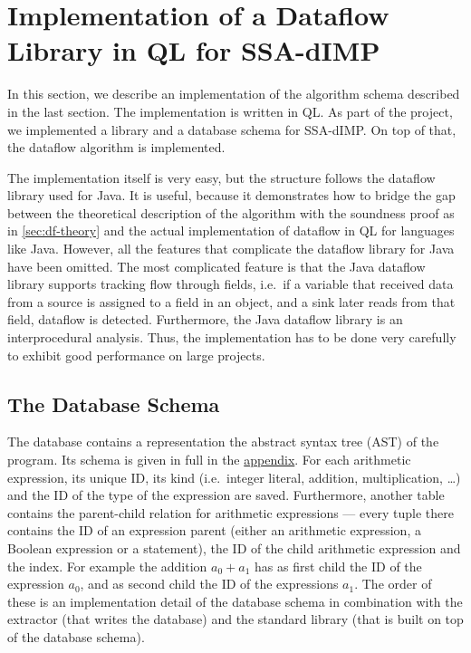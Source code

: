 \section{Implementation of a Dataflow Library in QL for SSA-dIMP}
In this section, we describe an implementation of the algorithm schema described in the
last section.
The implementation is written in QL.
As part of the project, we implemented a library and a database schema for SSA-dIMP.
On top of that, the dataflow algorithm is implemented.

The implementation itself is very easy, but the structure follows the
dataflow library used for Java.
It is useful, because it demonstrates how to bridge the gap between
the theoretical description of the algorithm with the soundness proof
as in \autoref{sec:df-theory} and the actual implementation of dataflow
in QL for languages like Java.
However, all the features that complicate the dataflow library for Java have been 
omitted.
The most complicated feature is that the Java dataflow library supports tracking 
flow through fields, i.e.\ if a variable that received data from a source 
is assigned to a field in an object, and a sink later reads from that field,
dataflow is detected.
Furthermore, the Java dataflow library is an interprocedural analysis.
Thus, the implementation has to be done very carefully to exhibit good
performance on large projects.

\subsection{The Database Schema}
The database contains a representation the abstract syntax tree (AST) of the program.
Its schema is given in full in the \hyperref[lst:dbschema]{appendix}.
For each arithmetic expression, its unique ID, its kind
(i.e.\ integer literal, addition, multiplication, \ldots) 
and the ID of the type of the expression are saved.
Furthermore, another table contains the parent-child relation for arithmetic 
expressions --- every tuple there contains the ID of an expression parent 
(either an arithmetic expression, a Boolean expression or a statement),
the ID of the child arithmetic expression and the index.
For example the addition $a_0 + a_1$ has as first child the ID of the expression 
$a_0$, and as second child the ID of the expressions $a_1$.
The order of these is an implementation detail of the database schema in combination
with the extractor (that writes the database) and the standard library 
(that is built on top of the database schema).

